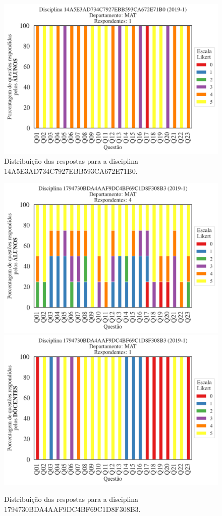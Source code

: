\documentclass[a4paper,10pt]{article}
\begin{document}
\begin{figure}[h]
\centering
\includegraphics[width=0.485\linewidth]{analise_disciplina_departamento_MAT_ALUNO_TURMA_14A5E3AD734C7927EBB593CA672E71B0.png}
\caption{\label{fig:analise_geral_departamento}                Distribuição das respostas para a disciplina 14A5E3AD734C7927EBB593CA672E71B0.}
\end{figure}
\begin{figure}[h]
\centering
\includegraphics[width=0.485\linewidth]{analise_disciplina_departamento_MAT_ALUNO_TURMA_1794730BDA4AAF9DC4BF69C1D8F308B3.png}
\includegraphics[width=0.485\linewidth]{analise_disciplina_departamento_MAT_DOCENTE_TURMA_1794730BDA4AAF9DC4BF69C1D8F308B3.png}
\caption{\label{fig:analise_geral_departamento}                Distribuição das respostas para a disciplina 1794730BDA4AAF9DC4BF69C1D8F308B3.}
\end{figure}
\end{document}
